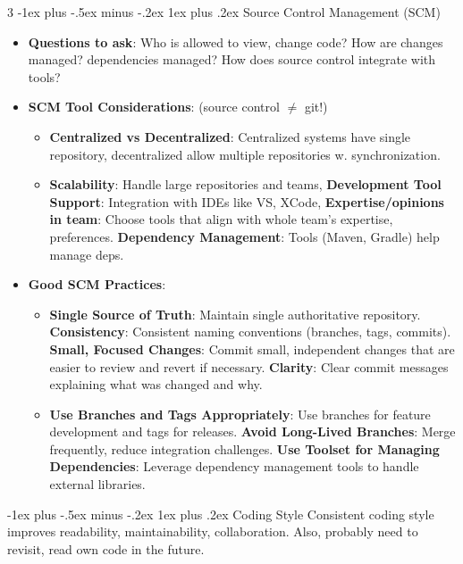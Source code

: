 \documentclass[a4paper, 10pt, landscape]{article}
\makeatletter
\renewcommand{\subsubsection}{\@startsection{subsubsection}{3}{0mm}%
                                {-1ex plus -.5ex minus -.2ex}%
                                {1ex plus .2ex}%
                                {\normalfont\small\bfseries}}
\makeatother
\begin{document}
\begin{multicols*}{3}
\subsubsection{Source Control Management (SCM)}
\begin{itemize}[itemsep=-1pt]
\item \textbf{Questions to ask}: Who is allowed to view, change code? How are changes managed? dependencies managed? How does source control integrate with tools?
\item \textbf{SCM Tool Considerations}: (source control $\neq$ git!)
	\begin{itemize}
	\item \textbf{Centralized vs Decentralized}: Centralized systems have single repository, decentralized allow multiple repositories w. synchronization.
	\item \textbf{Scalability}: Handle large repositories and teams, \textbf{Development Tool Support}: Integration with IDEs like VS, XCode, \textbf{Expertise/opinions in team}: Choose tools that align with whole team's expertise, preferences. \textbf{Dependency Management}: Tools (Maven, Gradle) help manage deps.
	\end{itemize}
\item \textbf{Good SCM Practices}:
	\begin{itemize}
	\item \textbf{Single Source of Truth}: Maintain single authoritative repository. \textbf{Consistency}: Consistent naming conventions (branches, tags, commits). 	\textbf{Small, Focused Changes}: Commit small, independent changes that are easier to review and revert if necessary. \textbf{Clarity}: Clear commit messages explaining what was changed and why.
	\item \textbf{Use Branches and Tags Appropriately}: Use branches for feature development and tags for releases. \textbf{Avoid Long-Lived Branches}: Merge frequently, reduce integration challenges. \textbf{Use Toolset for Managing Dependencies}: Leverage dependency management tools to handle external libraries.
	\end{itemize}
\end{itemize}

\subsubsection{Coding Style}
Consistent coding style improves readability, maintainability, collaboration. Also, probably need to revisit, read own code in the future.


\end{multicols*}
\end{document}
